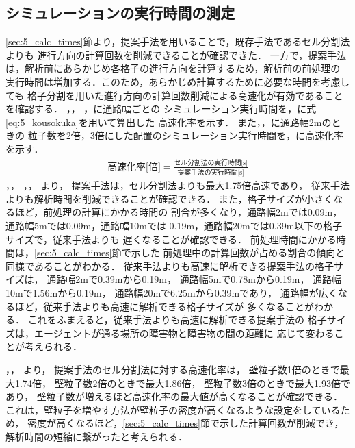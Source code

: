 \subsection{シミュレーションの実行時間の測定}
\label{sec:5_calc_jikan}
\ref{sec:5_calc_times}節より，提案手法を用いることで，既存手法であるセル分割法よりも
進行方向の計算回数を削減できることが確認できた．
一方で，提案手法は，解析前にあらかじめ各格子の進行方向を計算するため，解析前の前処理の
実行時間は増加する．このため，あらかじめ計算するために必要な時間を考慮しても
格子分割を用いた進行方向の計算回数削減による高速化が有効であることを確認する．
，，
，に通路幅ごとの
シミュレーション実行時間を，に式\eqref{eq:5_kousokuka}を用いて算出した
高速化率を示す．
また，，に通路幅2mのときの
粒子数を2倍，3倍にした配置のシミュレーション実行時間を，に高速化率を示す．
%
\begin{align}
	\mbox{高速化率[倍]} = \frac{\mbox{セル分割法の実行時間[s]}}
    {\mbox{提案手法の実行時間[s]}}
    \label{eq:5_kousokuka}
\end{align}
%
，，
，，
より，
提案手法は，セル分割法よりも最大1.75倍高速であり，
従来手法よりも解析時間を削減できることが確認できる．
また，格子サイズが小さくなるほど，前処理の計算にかかる時間の
割合が多くなり，通路幅2mでは0.09m，通路幅5mでは0.09m，通路幅10mでは
0.19m，通路幅20mでは0.39m以下の格子サイズで，従来手法よりも
遅くなることが確認できる．
前処理時間にかかる時間は，\ref{sec:5_calc_times}節で示した
前処理中の計算回数が占める割合の傾向と同様であることがわかる．
従来手法よりも高速に解析できる提案手法の格子サイズは，
通路幅2mで0.39mから0.19m，
通路幅5mで0.78mから0.19m，
通路幅10mで1.56mから0.19m，
通路幅20mで6.25mから0.39mであり，
通路幅が広くなるほど，従来手法よりも高速に解析できる格子サイズが
多くなることがわかる．
これをふまえると，従来手法よりも高速に解析できる提案手法の
格子サイズは，エージェントが通る場所の障害物と障害物の間の距離に
応じて変わることが考えられる．

，，
より，
提案手法のセル分割法に対する高速化率は，
壁粒子数1倍のときで最大1.74倍，
壁粒子数2倍のときで最大1.86倍，
壁粒子数3倍のときで最大1.93倍であり，
壁粒子数が増えるほど高速化率の最大値が高くなることが確認できる．
これは，壁粒子を増やす方法が壁粒子の密度が高くなるような設定をしているため，
密度が高くなるほど，\ref{sec:5_calc_times}節で示した計算回数が削減でき，
解析時間の短縮に繋がったと考えられる．



